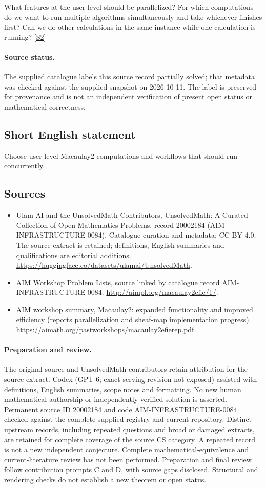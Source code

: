 \documentclass[11pt]{article}
\newcommand{\sref}[2]{\hyperlink{source:#1:#2}{[S#2]}}
\begin{document}
What features at the user level should be parallelized? For which computations do we want to run multiple algorithms simultaneously and take whichever finishes first? Can we do other calculations in the same instance while one calculation is running? \sref{20002184}{2}
\paragraph{Source status.}
The supplied catalogue labels this source record partially solved; that metadata was checked against the supplied snapshot on 2026-10-11. The label is preserved for provenance and is not an independent verification of present open status or mathematical correctness.
\subsection{Short English statement}
Choose user-level Macaulay2 computations and workflows that should run concurrently.
\subsection{Sources}
\begin{itemize}
\item[\hypertarget{source:20002184:1}{S1}] Ulam AI and the UnsolvedMath Contributors, UnsolvedMath: A Curated Collection of Open Mathematics Problems, record 20002184 (AIM-INFRASTRUCTURE-0084). Catalogue curation and metadata: CC BY 4.0. The source extract is retained; definitions, English summaries and qualifications are editorial additions.
\url{https://huggingface.co/datasets/ulamai/UnsolvedMath}.
\item[\hypertarget{source:20002184:2}{S2}] AIM Workshop Problem Lists, source linked by catalogue record AIM-INFRASTRUCTURE-0084.
\url{http://aimpl.org/macaulay2efie/1/}.
\item[\hypertarget{source:20002184:3}{S3}] AIM workshop summary, Macaulay2: expanded functionality and improved efficiency (reports parallelization and sheaf-map implementation progress).
\url{https://aimath.org/pastworkshops/macaulay2efierep.pdf}.
\end{itemize}
\paragraph{Preparation and review.}
The original source and UnsolvedMath contributors retain attribution for the source extract. Codex (GPT-6; exact serving revision not exposed) assisted with definitions, English summaries, scope notes and formatting. No new human mathematical authorship or independently verified solution is asserted. Permanent source ID 20002184 and code AIM-INFRASTRUCTURE-0084 checked against the complete supplied registry and current repository. Distinct upstream records, including repeated questions and broad or damaged extracts, are retained for complete coverage of the source CS category. A repeated record is not a new independent conjecture. Complete mathematical-equivalence and current-literature review has not been performed. Preparation and final review follow contribution prompts C and D, with source gaps disclosed. Structural and rendering checks do not establish a new theorem or open status.
\label{end:20002184}
\end{document}
